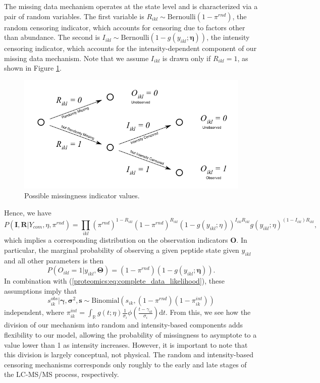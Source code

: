 The missing data mechanism operates at the state level and is characterized via a pair of random variables.
The first variable is $R_{ikl} \sim \text{Bernoulli}(1 - \pi^{rnd})$, the random censoring indicator, which accounts for censoring due to factors other than abundance.
The second is $I_{ikl} \sim \text{Bernoulli}(1 - g(y_{ikl}; \bm \eta))$, the intensity censoring indicator, which accounts for the intensity-dependent component of our missing data mechanism.
Note that we assume $I_{ikl}$ is drawn only if $R_{ikl} = 1$, as shown in Figure \ref{proteomics:fig:Missing_Data_Indicators_Tree}.
%
\begin{figure}[ht!]
\begin{center}
\includegraphics[width=.75\textwidth]{figures/proteomics/fig_tree_awb.pdf}
\end{center}
\caption{Possible missingness indicator values.\label{proteomics:fig:Missing_Data_Indicators_Tree}}
\end{figure}
%
Hence, we have
\begin{equation}
P(\bm I, \bm R | Y_{com}, \eta, \pi^{rnd}) =
\prod_{ikl} (\pi^{rnd})^{1 - R_{ikl}}
(1 - \pi^{rnd})^{R_{ikl}}
(1 - g(y_{ikl}; \eta))^{I_{ikl} R_{ikl}}
g(y_{ikl}; \eta)^{(1 - I_{ikl}) R_{ikl}},
\end{equation}
%
which implies a corresponding distribution on the observation indicators $\bm O$.
In particular, the marginal probability of observing a given peptide state given $y_{ikl}$ and all other parameters is then
%
\begin{equation}
P(O_{ikl} = 1 | y_{ikl}, \bm \Theta) = (1 - \pi^{rnd}) (1 - g(y_{ikl}; \bm \eta)).
\end{equation}
%
In combination with (\ref{proteomics:eq:complete_data_likelihood}), these assumptions imply that
\begin{equation}
s_{ik}^{obs} | \bm \gamma, \bm \sigma^2, \bm s \sim \text{Binomial}(s_{ik}, (1-\pi^{rnd})(1 - \pi^{int}_{ik}))
\end{equation}
independent, where $\pi^{int}_{ik} = \int_{\mathbb{R}} g(t; \eta) \frac{1}{\sigma_i} \phi\left( \frac{t - \gamma_{ik}}{\sigma_i} \right) \text{d}t$.
From this, we see how the division of our mechanism into random and intensity-based components adds flexibility to our model, allowing the probability of missingness to asymptote to a value lower than 1 as intensity increases.
However, it is important to note that this division is largely conceptual, not physical.
The random and intensity-based censoring mechanisms corresponds only roughly to the early and late stages of the LC-MS/MS process, respectively.

